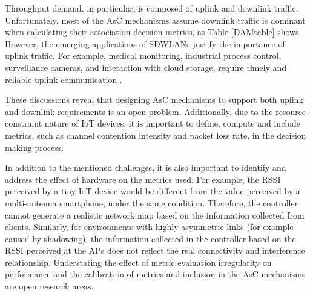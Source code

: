 
Throughput demand, in particular, is composed of uplink and downlink traffic.
Unfortunately, most of the AsC mechanisms assume downlink traffic is dominant when calculating their association decision metrics, as Table \ref{DAMtable} shows. 
However, the emerging applications of SDWLANs justify the importance of uplink traffic.
For example, medical monitoring, industrial process control, surveillance cameras, and interaction with cloud storage, require timely and reliable uplink communication \cite{MARS,RTwifi,REWIMO,IOT-future1, IOT-future2, singh_survey_2014}.


These discussions reveal that designing AsC mechanisms to support both uplink and downlink requirements is an open problem. 
Additionally, due to the resource-constraint nature of IoT devices, it is important to define, compute and include metrics, such as channel contention intensity and packet loss rate, in the decision making process.

In addition to the mentioned challenges, it is also important to identify and address the effect of hardware on the metrics used.
For example, the RSSI perceived by a tiny IoT device would be different from the value perceived by a multi-antenna smartphone, under the same condition.
Therefore, the controller cannot generate a realistic network map based on the information collected from clients.
Similarly, for environments with highly asymmetric links (for example caused by shadowing), the information collected in the controller based on the RSSI perceived at the APs does not reflect the real connectivity and interference relationship.
Understating the effect of metric evaluation irregularity on performance and the calibration of metrics and inclusion in the AsC mechanisms are open research areas.






